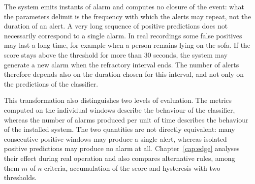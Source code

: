 The system emits instants of alarm and computes no closure of the event: what the parameters delimit is the frequency with which the alerts may repeat, not the duration of an alert.
A very long sequence of positive predictions does not necessarily correspond to a single alarm. In real recordings some false positives may last a long time, for example when a person remains lying on the sofa. If the score stays above the threshold for more than 30 seconds, the system may generate a new alarm when the refractory interval ends. The number of alerts therefore depends also on the duration chosen for this interval, and not only on the predictions of the classifier.

This transformation also distinguishes two levels of evaluation. The metrics computed on the individual windows describe the behaviour of the classifier, whereas the number of alarms produced per unit of time describes the behaviour of the installed system. The two quantities are not directly equivalent: many consecutive positive windows may produce a single alert, whereas isolated positive predictions may produce no alarm at all. Chapter~\ref{cap:edge} analyses their effect during real operation and also compares alternative rules, among them \(m\)-of-\(n\) criteria, accumulation of the score and hysteresis with two thresholds.

